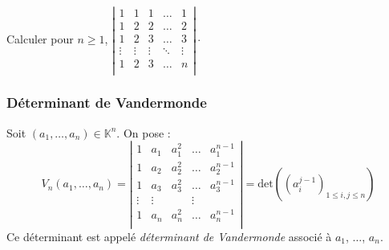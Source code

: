 \documentclass[a4paper,10pt]{report}
\begin{document}
\begin{Exemple}

\vspace{9cm}
\end{Exemple}


\begin{ApplicationDirecte} 
Calculer pour $n \geq 1$, $\left\vert \begin{array}{ccccc}
1 & 1 & 1 & \ldots & 1 \\
1 & 2 & 2 & \ldots & 2 \\
1 & 2 & 3 & \ldots & 3 \\
\vdots & \vdots & \vdots & \ddots & \vdots \\
1 & 2 & 3 & \ldots & n \\
\end{array} \right\vert \cdot$
\end{ApplicationDirecte}

\subsubsection{Déterminant de Vandermonde}

\begin{Definition}{} Soit $(a_1, \ldots, a_n) \in \mathbb{K}^n$. On pose :
$$ V_n(a_1, \ldots, a_n) = \left\vert \begin{array}{ccccc}
1 & a_1 & a_1^2 & \ldots & a_1^{n-1} \\
1 & a_2 & a_2^2 & \ldots & a_2^{n-1} \\
1 & a_3 & a_3^2 & \ldots & a_3^{n-1} \\
\vdots & \vdots & & \vdots \\
1 & a_n & a_n^2 & \ldots & a_n^{n-1} \\
\end{array}\right\vert = \textrm{det}( (a_i^{j-1})_{1 \leq i,j \leq n})$$
Ce déterminant est appelé \emph{déterminant de Vandermonde} associé à $a_1$, $\ldots$, $a_n$.
\end{Definition}
\end{document}

